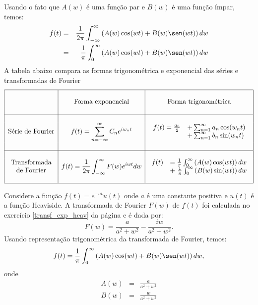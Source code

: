 Usando o fato que $A(w)$ é uma função par e $B(w)$ é uma função ímpar, temos:
\begin{eqnarray*}
f(t)&=&\frac{1}{2\pi}\int_{-\infty}^\infty\left(A(w)\cos(wt)+ B(w)\sen(wt)\right)dw\\
&=&\frac{1}{\pi}\int_{0}^\infty\left( A(w)\cos(wt)+ B(w)\sen(wt)\right)dw
\end{eqnarray*}
A tabela abaixo compara as formas trigonométrica e exponencial das séries e transformadas de Fourier
\begin{equation}
\begin{array}{|c|c|c|}
\hline &&\\
&\hbox{Forma exponencial}&\hbox{Forma trigonométrica}\\&&\\  \hline &&\\
\hbox{Série de Fourier}&\displaystyle f(t)=\sum_{n=-\infty}^\infty C_n e^{i w_n t} & \begin{array}{ll} f(t)=\frac{a_0}{2}&+\sum_{n=1}^\infty a_n \cos(w_nt)\\ &+\sum_{n=1}^\infty b_n \sin(w_nt) \end{array}   \\&&\\\hline &&\\
\begin{array}{c}
    \hbox{Transformada}\\
    \hbox{de Fourier}
\end{array} &\displaystyle f(t)=\frac{1}{2\pi}\int_{-\infty}^\infty F(w)e^{iwt}dw & \begin{array}{ll} f(t)&=\frac{1}{\pi}\int_{0}^\infty \left( A(w)\cos(wt)\right)dw\\&+~\frac{1}{\pi}\int_{0}^\infty \left( B(w)\sin(wt)\right)dw \end{array} \\   &&\\\hline
\end{array}
\end{equation}
\begin{ex}{\label{ex_trans_rep_1}} Considere a função $f(t)=e^{-at}u(t)$ onde $a$ é uma constante positiva e $u(t)$ é a função Heaviside. A transformada de Fourier $F(w)$ de $f(t)$ foi calculada no exercício \ref{transf_exp_heav} da página \pageref{transf_exp_heav} e é dada por:
\begin{equation*}
F(w)=\frac{a}{a^2+w^2}-\frac{iw}{a^2+w^2}.
\end{equation*}
Usando representação trigonométrica da transformada de Fourier, temos:
\begin{eqnarray*}
f(t)=\frac{1}{\pi}\int_{0}^\infty\left( A(w)\cos(wt)+ B(w)\sen(wt)\right)dw,
\end{eqnarray*}
onde
\begin{eqnarray*}
A(w)&=&\frac{a}{a^2+w^2}\\
B(w)&=&\frac{w}{a^2+w^2}
\end{eqnarray*}
\end{ex}
